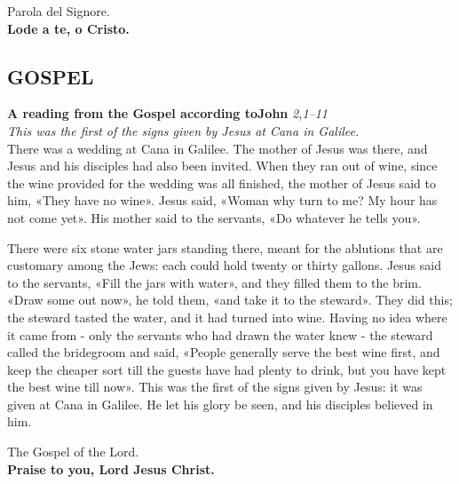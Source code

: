 \documentclass[10pt,b6paper,usenames,twoside]{article}
\begin{document}
\noindent Parola del Signore.\\ \textbf{Lode a te, o Cristo.}\\
\clearpage

\subsection*{\textcolor{forestgreen(traditional)}{GOSPEL}} 


\noindent \textcolor{forestgreen(traditional)}{\CrossMaltese} \hspace*{1mm} \textbf{A reading from the Gospel according to\linebreak John} \hfill \textcolor{forestgreen(traditional)}{\textit{2,1--11}}\\ 
\textcolor{forestgreen(traditional)}{\textit{\footnotesize{This was the first of the signs given by Jesus at Cana in Galilee.}}} \\ 

There was a wedding at Cana in Galilee. The mother of Jesus was there, and Jesus and his disciples had also been invited. When they ran out of wine, since the wine provided for the wedding was all finished, the mother of Jesus said to him, «They have no wine». Jesus said, «Woman why turn to me? My hour has not come yet». His mother said to the servants, «Do whatever he tells you». 

There were six stone water jars standing there, meant for the ablutions that are customary among the Jews: each could hold twenty or thirty gallons. Jesus said to the servants, «Fill the jars with water», and they filled them to the brim. «Draw some out now», he told them, «and take it to the steward». They did this; the steward tasted the water, and it had turned into wine. Having no idea where it came from - only the servants who had drawn the water knew - the steward called the bridegroom and said, «People generally serve the best wine first, and keep the cheaper sort till the guests have had plenty to drink, but you have kept the best wine till now».
This was the first of the signs given by Jesus: it was given at Cana in Galilee. He let his glory be seen, and his disciples believed in him.

\noindent The Gospel of the Lord.\\ \textbf{Praise to you, Lord Jesus Christ.}

\clearpage

\section*{\textcolor{forestgreen(traditional)}{}} 
\end{document}
